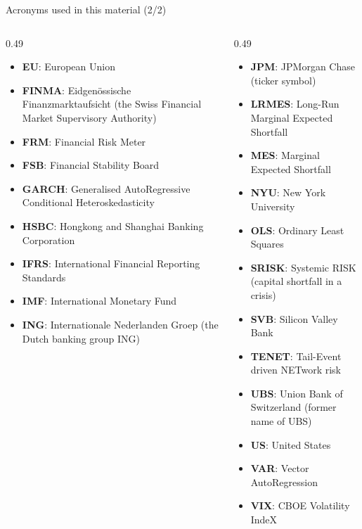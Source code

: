 \begin{frame}{Acronyms used in this material (2/2)}
\begin{columns}[T]
\begin{column}{0.49\textwidth}
\begin{itemize}\setlength{\itemsep}{0pt}
    \item \textbf{EU}: European Union
    \item \textbf{FINMA}: Eidgenössische Finanzmarktaufsicht (the Swiss Financial Market Supervisory Authority)
    \item \textbf{FRM}: Financial Risk Meter
    \item \textbf{FSB}: Financial Stability Board
    \item \textbf{GARCH}: Generalised AutoRegressive Conditional Heteroskedasticity
    \item \textbf{HSBC}: Hongkong and Shanghai Banking Corporation
    \item \textbf{IFRS}: International Financial Reporting Standards
    \item \textbf{IMF}: International Monetary Fund
    \item \textbf{ING}: Internationale Nederlanden Groep (the Dutch banking group ING)
\end{itemize}
\end{column}
\begin{column}{0.49\textwidth}
\begin{itemize}\setlength{\itemsep}{0pt}
    \item \textbf{JPM}: JPMorgan Chase (ticker symbol)
    \item \textbf{LRMES}: Long-Run Marginal Expected Shortfall
    \item \textbf{MES}: Marginal Expected Shortfall
    \item \textbf{NYU}: New York University
    \item \textbf{OLS}: Ordinary Least Squares
    \item \textbf{SRISK}: Systemic RISK (capital shortfall in a crisis)
    \item \textbf{SVB}: Silicon Valley Bank
    \item \textbf{TENET}: Tail-Event driven NETwork risk
    \item \textbf{UBS}: Union Bank of Switzerland (former name of UBS)
    \item \textbf{US}: United States
    \item \textbf{VAR}: Vector AutoRegression
    \item \textbf{VIX}: CBOE Volatility IndeX
\end{itemize}
\end{column}
\end{columns}
\end{frame}

